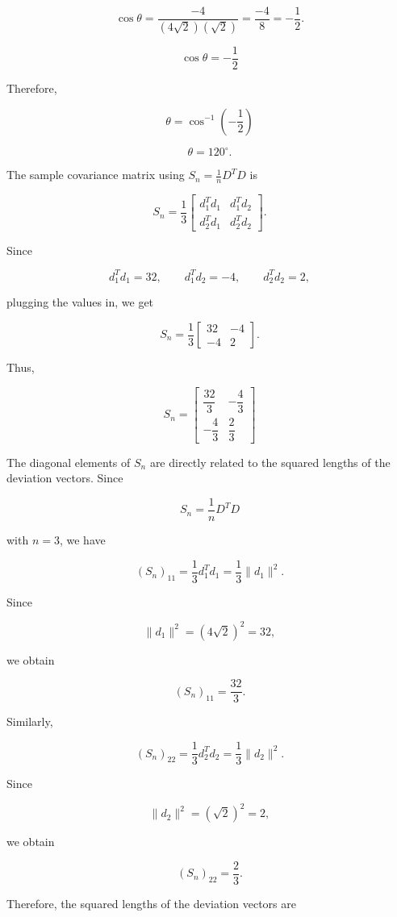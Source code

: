 \documentclass{article}
\begin{document}
$$
\cos\theta
=
\frac{-4}
{(4\sqrt{2})(\sqrt{2})}
=
\frac{-4}{8}
=
-\frac{1}{2}.
$$

$$
\boxed{\cos\theta=-\frac{1}{2}}
$$

Therefore,

$$
\theta
=
\cos^{-1}\left(-\frac{1}{2}\right)
$$

$$
\boxed{\theta=120^\circ}.
$$

The sample covariance matrix using $S_n=\frac{1}{n}D^TD$ is

$$
S_n
=
\frac{1}{3}
\begin{bmatrix}
d_1^Td_1 & d_1^Td_2\\
d_2^Td_1 & d_2^Td_2
\end{bmatrix}.
$$

Since

$$
d_1^Td_1=32,
\qquad
d_1^Td_2=-4,
\qquad
d_2^Td_2=2,
$$

plugging the values in, we get

$$
S_n
=
\frac{1}{3}
\begin{bmatrix}
32&-4\\
-4&2
\end{bmatrix}.
$$

Thus,

$$
\boxed{
S_n=
\begin{bmatrix}
\dfrac{32}{3}&-\dfrac{4}{3}\\[0.5em]
-\dfrac{4}{3}&\dfrac{2}{3}
\end{bmatrix}}
$$

The diagonal elements of $S_n$ are directly related to the squared
lengths of the deviation vectors. Since

$$
S_n=\frac{1}{n}D^TD
$$

with $n=3$, we have

$$
(S_n)_{11}
=
\frac{1}{3}d_1^Td_1
=
\frac{1}{3}\|d_1\|^2.
$$

Since

$$
\|d_1\|^2=(4\sqrt{2})^2=32,
$$

we obtain

$$
(S_n)_{11}
=
\frac{32}{3}.
$$

Similarly,

$$
(S_n)_{22}
=
\frac{1}{3}d_2^Td_2
=
\frac{1}{3}\|d_2\|^2.
$$

Since

$$
\|d_2\|^2=(\sqrt{2})^2=2,
$$

we obtain

$$
(S_n)_{22}
=
\frac{2}{3}.
$$

Therefore, the squared lengths of the deviation vectors are
\end{document}
